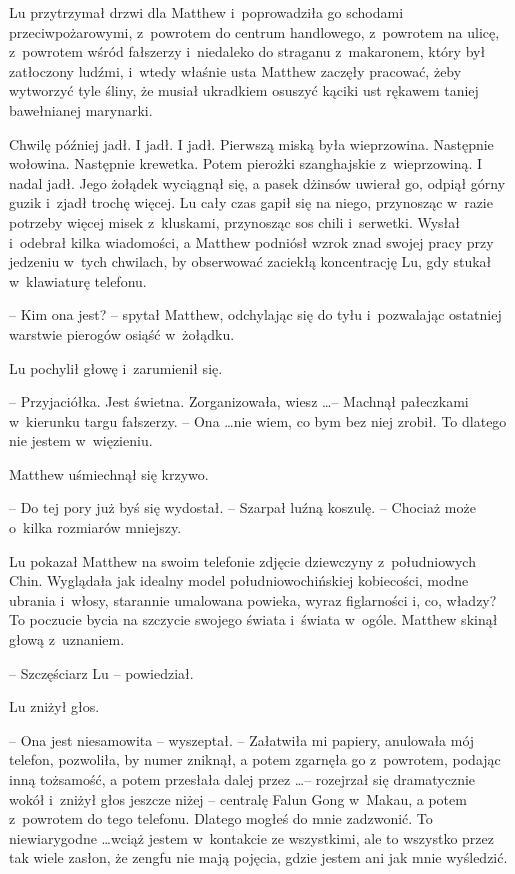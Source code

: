 \documentclass[oneside,polish,11pt,rmheadings]{mwbk}
\begin{document}
Lu przytrzymał drzwi dla Matthew i~poprowadziła go schodami przeciwpożarowymi, z~powrotem do centrum handlowego, z~powrotem na ulicę, z~powrotem wśród fałszerzy i~niedaleko do straganu z~makaronem, który był zatłoczony ludźmi, i~wtedy właśnie usta Matthew zaczęły pracować, żeby wytworzyć tyle śliny, że musiał ukradkiem osuszyć kąciki ust rękawem taniej bawełnianej marynarki.

Chwilę później jadł. I jadł. I jadł. Pierwszą miską była wieprzowina. Następnie wołowina. Następnie krewetka. Potem pierożki szanghajskie z~wieprzowiną. I nadal jadł. Jego żołądek wyciągnął się, a pasek dżinsów uwierał go, odpiął górny guzik i~zjadł trochę więcej. Lu cały czas gapił się na niego, przynosząc w~razie potrzeby więcej misek z~kluskami, przynosząc sos chili i~serwetki. Wysłał i~odebrał kilka wiadomości, a Matthew podniósł wzrok znad swojej pracy przy jedzeniu w~tych chwilach, by obserwować zaciekłą koncentrację Lu, gdy stukał w~klawiaturę telefonu.

-- Kim ona jest? -- spytał Matthew, odchylając się do tyłu i~pozwalając ostatniej warstwie pierogów osiąść w~żołądku.

Lu pochylił głowę i~zarumienił się. 

-- Przyjaciółka. Jest świetna. Zorganizowała, wiesz \ldots  -- Machnął pałeczkami w~kierunku targu fałszerzy. -- Ona \ldots  nie wiem, co bym bez niej zrobił. To dlatego nie jestem w~więzieniu.

Matthew uśmiechnął się krzywo. 

-- Do tej pory już byś się wydostał. -- Szarpał luźną koszulę. -- Chociaż może o~kilka rozmiarów mniejszy.

Lu pokazał Matthew na swoim telefonie zdjęcie dziewczyny z~południowych Chin. Wyglądała jak idealny model południowochińskiej kobiecości, modne ubrania i~włosy, starannie umalowana powieka, wyraz figlarności i, co, władzy? To poczucie bycia na szczycie swojego świata i~świata w~ogóle. Matthew skinął głową z~uznaniem. 

-- Szczęściarz Lu -- powiedział.

Lu zniżył głos.

-- Ona jest niesamowita -- wyszeptał. -- Załatwiła mi papiery, anulowała mój telefon, pozwoliła, by numer zniknął, a potem zgarnęła go z~powrotem, podając inną tożsamość, a potem przesłała dalej przez \ldots  -- rozejrzał się dramatycznie wokół i~zniżył głos jeszcze niżej -- centralę Falun Gong w~Makau, a potem z~powrotem do tego telefonu. Dlatego mogłeś do mnie zadzwonić. To niewiarygodne  \ldots  wciąż jestem w~kontakcie ze wszystkimi, ale to wszystko przez tak wiele zasłon, że zengfu nie mają pojęcia, gdzie jestem ani jak mnie wyśledzić. 
\end{document}
